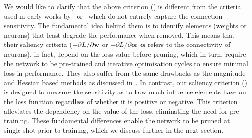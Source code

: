 %
We would like to clarify that the above criterion () is different from the criteria used in early works by~\cite{NIPS1988_119} or~\cite{karnin1990simple} which do not entirely capture the connection sensitivity.
The fundamental idea behind them is to identify elements (\eg weights or neurons) that least degrade the performance when removed.
This means that their saliency criteria (\ie $-{\partial L}/{\partial {\mathbf{w}}}$ or $-{\partial L}/{\partial {\boldsymbol{\alpha}}}$; $\boldsymbol{\alpha}$ refers to the connectivity of neurons), in fact, depend on the loss value before pruning, which in turn, require the network to be pre-trained and iterative optimization cycles to ensure minimal loss in performance.
They also suffer from the same drawbacks as the magnitude and Hessian based methods as discussed in~.
In contrast, our saliency criterion () is designed to measure the sensitivity as to how much influence elements have on the loss function regardless of whether it is positive or negative.
This criterion alleviates the dependency on the value of the loss, eliminating the need for pre-training.
These fundamental differences enable the network to be pruned at single-shot prior to training, which we discuss further in the next section.





